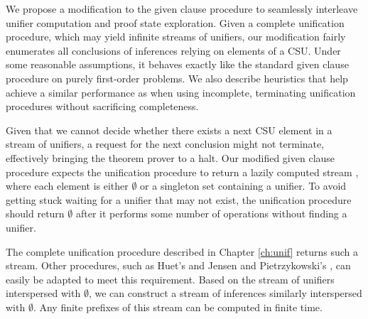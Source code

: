 We propose a modification to the given clause procedure to seamlessly
interleave unifier computation and proof state exploration. Given a complete
unification procedure, which may yield infinite streams of unifiers, our
modification fairly enumerates all conclusions of inferences relying on
elements of a CSU. Under some reasonable assumptions, it behaves exactly like
the standard given clause procedure on purely first-order problems.
We also describe heuristics that help achieve a similar
performance as when using incomplete, terminating unification procedures
without sacrificing completeness.
\pagebreak[2]

Given that we cannot decide whether there exists a next CSU
element in a stream of unifiers, a request for the next conclusion might not
terminate,
effectively bringing the theorem prover to a halt. Our modified given clause procedure
expects the unification procedure to return a lazily computed stream
\cite[Sect.~4.2]{co-1999-funds}, where each element is either $\emptyset$ or
a singleton set containing a unifier. To avoid getting stuck waiting for a unifier
that may not exist, the unification procedure should return
$\emptyset$ after it performs some number of operations without finding a unifier.

The complete unification procedure described in Chapter \ref{ch:unif} returns such a stream. Other procedures, such
as Huet's \cite{gh-75-unification} and Jensen and
Pietrzykowski's \cite{jp-76-unif}, can easily be adapted to meet this
requirement. Based on the stream of unifiers interspersed with $\emptyset$, we
can construct a stream of inferences similarly interspersed with $\emptyset$.
Any finite prefixes of this stream can be computed in finite time.

